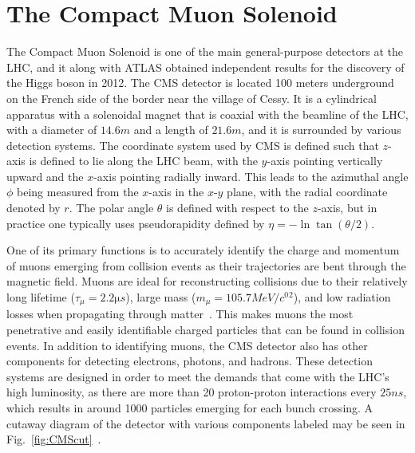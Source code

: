 \section{The Compact Muon Solenoid}
\label{sec:CMS}

The Compact Muon Solenoid is one of the main general-purpose detectors at the LHC, and it along with ATLAS obtained independent results for the discovery of the Higgs boson in 2012.
The CMS detector is located 100 meters underground on the French side of the border near the village of Cessy.
It is a cylindrical apparatus with a solenoidal magnet that is coaxial with the beamline of the LHC, with a diameter of $14.6\unit{m}$ and a length of $21.6\unit{m}$, and it is surrounded by various detection systems.
The coordinate system used by CMS is defined such that $z$-axis is defined to lie along the LHC beam, with the $y$-axis pointing vertically upward and the $x$-axis pointing radially inward.
This leads to the azimuthal angle $\phi$ being measured from the $x$-axis in the $x$-$y$ plane, with the radial coordinate denoted by $r$.
The polar angle $\theta$ is defined with respect to the $z$-axis, but in practice one typically uses pseudorapidity defined by $\eta=-\ln\tan(\theta/2)$.

One of its primary functions is to accurately identify the charge and momentum of muons emerging from collision events as their trajectories are bent through the magnetic field.
Muons are ideal for reconstructing collisions due to their relatively long lifetime ($\tau_\mu=2.2\unit{\micro s}$), large mass ($m_\mu=105.7\unit{MeV/\clight^2}$), and low radiation losses when propagating through matter~\cite{peskin2019}.
This makes muons the most penetrative and easily identifiable charged particles that can be found in collision events. %
In addition to identifying muons, the CMS detector also has other components for detecting electrons, photons, and hadrons.
These detection systems are designed in order to meet the demands that come with the LHC's high luminosity, as there are more than 20 proton-proton interactions every $25\unit{ns}$, which results in around 1000 particles emerging for each bunch crossing. %
A cutaway diagram of the detector with various components labeled may be seen in Fig.~\ref{fig:CMScut}~\cite{Sakuma:2665537}.

